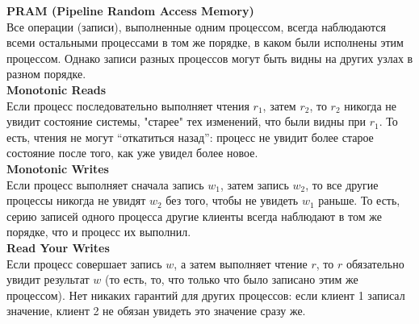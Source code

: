 \textbf{PRAM (Pipeline Random Access Memory)}~\\

Все операции (записи), выполненные одним процессом, всегда наблюдаются всеми остальными процессами в том же порядке, в каком были исполнены этим процессом. Однако записи разных процессов могут быть видны на других узлах в разном порядке.\autocite{jepsen-pram}~\\


\textbf{Monotonic Reads}~\\

Если процесс последовательно выполняет чтения $r_1$, затем $r_2$, то $r_2$ никогда не увидит состояние системы, "старее" тех изменений, что были видны при $r_1$.  
То есть, чтения не могут “откатиться назад”: процесс не увидит более старое состояние после того, как уже увидел более новое. \autocite{jepsen-monotonic-reads}~\\


\textbf{Monotonic Writes}~\\

Если процесс выполняет сначала запись $w_1$, затем запись $w_2$, то все другие процессы никогда не увидят $w_2$ без того, чтобы не увидеть $w_1$ раньше.  
То есть, серию записей одного процесса другие клиенты всегда наблюдают в том же порядке, что и процесс их выполнил.\autocite{jepsen-monotonic-writes}~\\

\textbf{Read Your Writes}~\\

Если процесс совершает запись $w$, а затем выполняет чтение $r$, то $r$ обязательно увидит результат $w$ (то есть, то, что только что было записано этим же процессом).
Нет никаких гарантий для других процессов: если клиент 1 записал значение, клиент 2 не обязан увидеть это значение сразу же.\autocite{jepsen-read-your-writes}~\\


